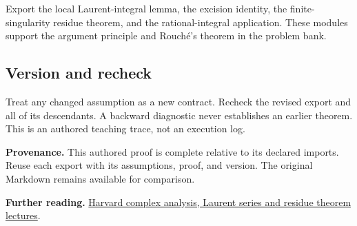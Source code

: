\documentclass[preprint,12pt,aps,pra,showkeys,amsmath,amssymb,superscriptaddress,floatfix]{revtex4-2}
\theoremstyle{definition}
\theoremstyle{remark}
\begin{document}
Export the local Laurent-integral lemma, the excision identity, the
finite-singularity residue theorem, and the rational-integral
application. These modules support the argument principle and Rouché's
theorem in the problem bank.

\subsection{Version and recheck}
Treat any changed assumption as a new contract. Recheck the revised
export and all of its descendants. A backward diagnostic never
establishes an earlier theorem. This is an authored teaching trace, not
an execution log.

\par\medskip\begingroup\small\linespread{1.0}\selectfont\noindent\textbf{Provenance.} This authored proof is complete relative to its declared imports. Reuse
each export with its assumptions, proof, and version. The original
Markdown remains available for comparison.
\par\endgroup

\par\smallskip\begingroup\small\linespread{1.0}\selectfont\noindent\textbf{Further reading.} \href{https://people.math.harvard.edu/~siu/math113/}{Harvard complex
analysis, Laurent series and residue theorem lectures}.\par\endgroup
\end{document}
